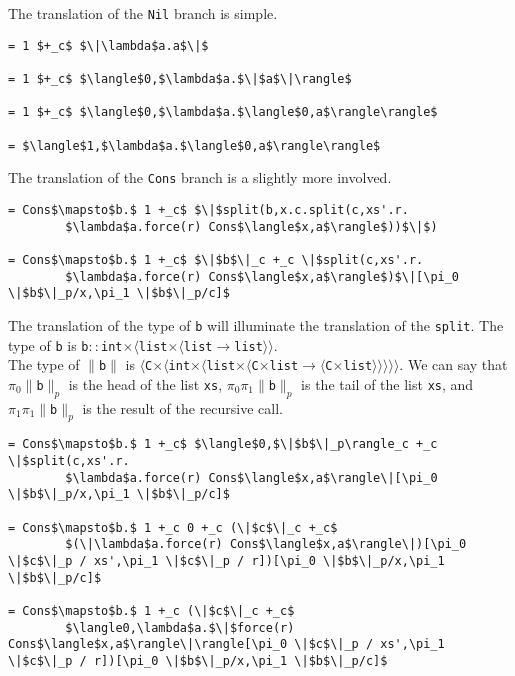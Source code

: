 \documentclass[12pt,letterpaper]{article}
\begin{document}
The translation of the \texttt{Nil} branch is simple.
\begin{lstlisting}
= 1 $+_c$ $\|\lambda$a.a$\|$

= 1 $+_c$ $\langle$0,$\lambda$a.$\|$a$\|\rangle$

= 1 $+_c$ $\langle$0,$\lambda$a.$\langle$0,a$\rangle\rangle$

= $\langle$1,$\lambda$a.$\langle$0,a$\rangle\rangle$
\end{lstlisting}

The translation of the \texttt{Cons} branch is a slightly more involved.
\begin{lstlisting}
= Cons$\mapsto$b.$ 1 +_c$ $\|$split(b,x.c.split(c,xs'.r.
        $\lambda$a.force(r) Cons$\langle$x,a$\rangle$))$\|$)

= Cons$\mapsto$b.$ 1 +_c$ $\|$b$\|_c +_c \|$split(c,xs'.r.
        $\lambda$a.force(r) Cons$\langle$x,a$\rangle$)$\|[\pi_0 \|$b$\|_p/x,\pi_1 \|$b$\|_p/c]$
\end{lstlisting}

The translation of the type of \texttt{b} will illuminate the translation of the \texttt{split}.
The type of \texttt{b} is \texttt{b$::$int$\times \langle$list$\times \langle$list$\to$list$\rangle\rangle$}.\\
The type of \texttt{$\|$b$\|$} is \texttt{$\langle$C$\times \langle$int$\times\langle$list$\times \langle$C$\times$list$\to\langle$C$\times$list$\rangle\rangle\rangle\rangle\rangle$}.
We can say that \texttt{$\pi_0\|$b$\|_p$} is the head of the list \texttt{xs},
\texttt{$\pi_0\pi_1\|$b$\|_p$} is the tail of the list \texttt{xs},
and \texttt{$\pi_1\pi_1\|$b$\|_p$} is the result of the recursive call.

\begin{lstlisting}
= Cons$\mapsto$b.$ 1 +_c$ $\langle$0,$\|$b$\|_p\rangle_c +_c \|$split(c,xs'.r.
        $\lambda$a.force(r) Cons$\langle$x,a$\rangle\|[\pi_0 \|$b$\|_p/x,\pi_1 \|$b$\|_p/c]$

= Cons$\mapsto$b.$ 1 +_c 0 +_c (\|$c$\|_c +_c$
        $(\|\lambda$a.force(r) Cons$\langle$x,a$\rangle\|)[\pi_0 \|$c$\|_p / xs',\pi_1 \|$c$\|_p / r])[\pi_0 \|$b$\|_p/x,\pi_1 \|$b$\|_p/c]$

= Cons$\mapsto$b.$ 1 +_c (\|$c$\|_c +_c$
        $\langle0,\lambda$a.$\|$force(r) Cons$\langle$x,a$\rangle\|\rangle[\pi_0 \|$c$\|_p / xs',\pi_1 \|$c$\|_p / r])[\pi_0 \|$b$\|_p/x,\pi_1 \|$b$\|_p/c]$
\end{lstlisting}
\end{document}
